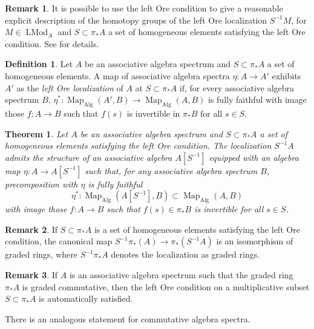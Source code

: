 \documentclass[12pt]{article}
\newtheorem{theorem}{Theorem}[subsection]
\theoremstyle{definition}
\newtheorem{definition}{Definition}[subsection]
\newtheorem{remark}{Remark}[subsection]
\DeclareMathOperator{\LMod}{LMod}
\DeclareMathOperator{\Alg}{Alg}
\DeclareMathOperator{\Map}{Map}
\begin{document}
\begin{remark}
It is possible to use the left Ore condition to give a reasonable explicit description of the homotopy groups of the left Ore localization $S^{-1}M$, for $M\in\LMod_A$ and $S\subset\pi_* A$ a set of homogeneous elements satisfying the left Ore condition.
See \cite[Construction 7.2.3.19 and Proposition 7.2.3.20]{HA} for details.
\end{remark}

\begin{definition}
Let $A$ be an associative algebra spectrum and $S\subset\pi_* A$ a set of homogeneous elements.
A map of associative algebra spectra $\eta:A\to A'$ exhibits $A'$ as the {\em left Ore localization} of $A$ at $S\subset\pi_* A$ if, for every associative algebra spectrum $B$, $\eta^*:\Map_{\Alg}(A',B)\to\Map_{\Alg}(A,B)$ is fully faithful with image those $f:A\to B$ such that $f(s)$ is invertible in $\pi_* B$ for all $s\in S$.
\end{definition}

\begin{theorem}{\em \cite[Proposition 7.2.3.27]{HA}}
Let $A$ be an associative algebra spectrum and $S\subset\pi_* A$ a set of homogeneous elements satisfying the left Ore condition.
The localization $S^{-1} A$ admits the structure of an associative algebra $A[S^{-1}]$ equipped with an algebra map $\eta:A\to A[S^{-1}]$ such that, for any associative algebra spectrum $B$, precomposition with $\eta$ is fully faithful
\[
\eta^*:\Map_{\Alg}(A[S^{-1}],B)\subset\Map_{\Alg}(A,B)
\]
with image those $f:A\to B$ such that $f(s)\in\pi_* B$ is
invertible for all $s\in S$.
\end{theorem}

\begin{remark}
If $S\subset\pi_* A$ is a set of homogeneous elements satisfying the left Ore condition, the canonical map $S^{-1}\pi_*(A)\to\pi_*(S^{-1}A)$ is an isomorphism of graded rings, where $S^{-1}\pi_*A$ denotes the localization as graded rings.
\end{remark}

\begin{remark}
If $A$ is an associative algebra spectrum such that the graded ring $\pi_* A$ is graded commutative, then the left Ore condition on a multiplicative subset $S\subset\pi_* A$ is automatically satisfied.
\end{remark}

There is an analogous statement for commutative algebra spectra.
\end{document}
